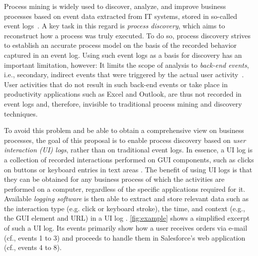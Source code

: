 \label{sec:startingpoint}

Process mining is widely used to discover, analyze, and improve business processes 
based on event data extracted from IT systems, stored in so-called event logs~\cite{van2016data}.
A key task in this regard is \emph{process discovery}, which aims to reconstruct how a process was truly executed. To do so, process discovery strives to establish an accurate process model on the basis of the recorded behavior captured in an event log.
Using such event logs as a basis for discovery has an important limitation, however: It limits the scope of analysis to \textit{back-end events}, i.e., secondary, indirect events that were triggered by the actual user activity~\cite{diba2020extraction}. User activities that do not result in such back-end events or take place in productivity applications such as Excel and Outlook, are thus not recorded in event logs and, therefore, invisible to traditional process mining and discovery techniques. 

To avoid this problem and be able to obtain a comprehensive view on business processes, the goal of this proposal is to enable process discovery based on \textit{user interaction (UI) logs}, rather than on traditional event logs. In essence, a UI log is a collection of recorded interactions performed on GUI components, such as clicks on buttons or keyboard entries in text areas \cite{Urabe21,abb2022reference}. The benefit of using UI logs is that they 
can be obtained for any business process of which the activities are performed on a computer, regardless of the specific applications required for it.
Available \textit{logging software} is then able to extract and store relevant data such as the interaction type (e.g. click or keyboard stroke), the time, and context (e.g., the GUI element and URL) in a UI log  \cite{leno2019action}. 
\autoref{fig:example} shows a simplified excerpt of such a UI log.
Its events primarily show how a user receives orders via e-mail (cf., events 1 to 3) and proceeds to handle them in Salesforce's web application (cf., events 4 to 8).



